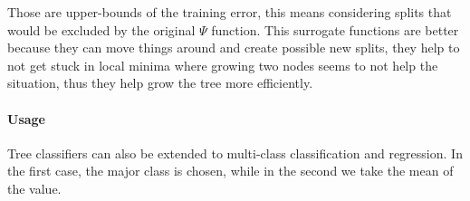 Those are upper-bounds of the training error, this means considering 
splits that would be excluded by the original $\Psi$ function.
This surrogate functions are better because they can move things around and 
create possible new splits, they help to not get stuck in local minima where 
growing two nodes seems to not help the situation, thus they help 
grow the tree more efficiently.

\paragraph{Usage}
Tree classifiers can also be extended to multi-class classification and regression.
In the first case, the major class is chosen, while in the second we take the mean of the value.
